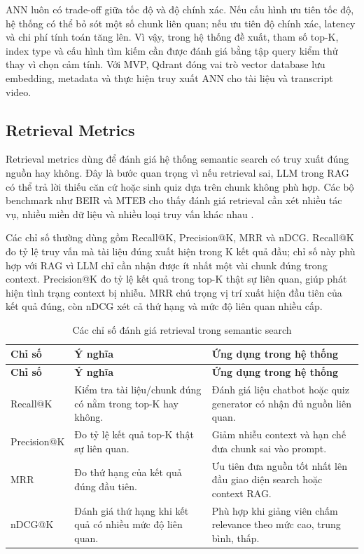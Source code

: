 ANN luôn có trade-off giữa tốc độ và độ chính xác. Nếu cấu hình ưu tiên tốc độ,
hệ thống có thể bỏ sót một số chunk liên quan; nếu ưu tiên độ chính xác, latency
và chi phí tính toán tăng lên. Vì vậy, trong hệ thống đề xuất, tham số top-K,
index type và cấu hình tìm kiếm cần được đánh giá bằng tập query kiểm thử thay
vì chọn cảm tính. Với MVP, Qdrant đóng vai trò vector database lưu embedding,
metadata và thực hiện truy xuất ANN cho tài liệu và transcript video.

\subsection{Retrieval Metrics}
\label{subsec:retrieval-metrics}

Retrieval metrics dùng để đánh giá hệ thống semantic search có truy xuất đúng
nguồn hay không. Đây là bước quan trọng vì nếu retrieval sai, LLM trong RAG có
thể trả lời thiếu căn cứ hoặc sinh quiz dựa trên chunk không phù hợp. Các bộ
benchmark như BEIR và MTEB cho thấy đánh giá retrieval cần xét nhiều tác vụ,
nhiều miền dữ liệu và nhiều loại truy vấn khác nhau \cite{thakur2021beir,muennighoff2023mteb}.

Các chỉ số thường dùng gồm Recall@K, Precision@K, MRR và nDCG. Recall@K đo tỷ lệ
truy vấn mà tài liệu đúng xuất hiện trong K kết quả đầu; chỉ số này phù hợp với
RAG vì LLM chỉ cần nhận được ít nhất một vài chunk đúng trong context. Precision@K
đo tỷ lệ kết quả trong top-K thật sự liên quan, giúp phát hiện tình trạng context
bị nhiễu. MRR chú trọng vị trí xuất hiện đầu tiên của kết quả đúng, còn nDCG xét
cả thứ hạng và mức độ liên quan nhiều cấp.

\begin{longtable}{|p{3cm}|p{4.2cm}|p{6.8cm}|}
\caption{Các chỉ số đánh giá retrieval trong semantic search}
\label{tab:retrieval-metrics}\\
\hline
\textbf{Chỉ số} & \textbf{Ý nghĩa} & \textbf{Ứng dụng trong hệ thống} \\
\hline
\endfirsthead
\hline
\textbf{Chỉ số} & \textbf{Ý nghĩa} & \textbf{Ứng dụng trong hệ thống} \\
\hline
\endhead
Recall@K & Kiểm tra tài liệu/chunk đúng có nằm trong top-K hay không. & Đánh giá liệu chatbot hoặc quiz generator có nhận đủ nguồn liên quan. \\
\hline
Precision@K & Đo tỷ lệ kết quả top-K thật sự liên quan. & Giảm nhiễu context và hạn chế đưa chunk sai vào prompt. \\
\hline
MRR & Đo thứ hạng của kết quả đúng đầu tiên. & Ưu tiên đưa nguồn tốt nhất lên đầu giao diện search hoặc context RAG. \\
\hline
nDCG@K & Đánh giá thứ hạng khi kết quả có nhiều mức độ liên quan. & Phù hợp khi giảng viên chấm relevance theo mức cao, trung bình, thấp. \\
\hline
\end{longtable}

